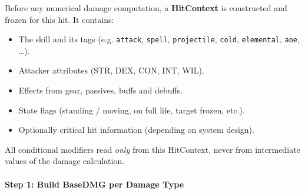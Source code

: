 Before any numerical damage computation, a \textbf{HitContext} is constructed and frozen for this hit. It contains:

\begin{itemize}
	\item The skill and its tags (e.g. \texttt{attack}, \texttt{spell}, \texttt{projectile},
	\texttt{cold}, \texttt{elemental}, \texttt{aoe}, \dots).
	\item Attacker attributes (STR, DEX, CON, INT, WIL).
	\item Effects from gear, passives, buffs and debuffs.
	\item State flags (standing / moving, on full life, target frozen, etc.).
	\item Optionally critical hit information (depending on system design).
\end{itemize}

All conditional modifiers read \emph{only} from this HitContext, never from intermediate values of the damage calculation.

\paragraph{Step 1: Build BaseDMG per Damage Type}

